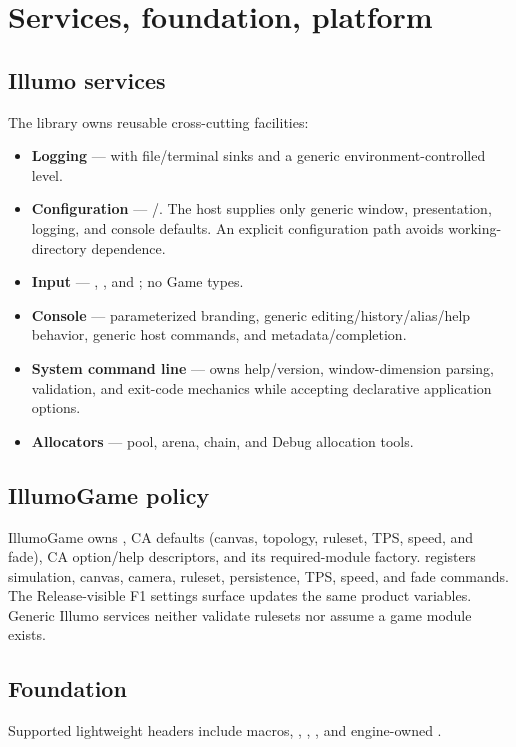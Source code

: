 \section{Services, foundation, platform}
\label{sec:services}

\subsection{Illumo services}
The library owns reusable cross-cutting facilities:
\begin{itemize}
  \item \textbf{Logging} ---  with file/terminal sinks and a
        generic environment-controlled level.
  \item \textbf{Configuration} --- /.
        The host supplies only generic window, presentation, logging, and console
        defaults. An explicit configuration path avoids working-directory
        dependence.
  \item \textbf{Input} --- , ,
        and ; no Game types.
  \item \textbf{Console} --- parameterized  branding,
        generic editing/history/alias/help behavior, generic host commands, and
         metadata/completion.
  \item \textbf{System command line} ---  owns
        help/version, window-dimension parsing, validation, and exit-code
        mechanics while accepting declarative application options.
  \item \textbf{Allocators} --- pool, arena, chain, and Debug allocation tools.
\end{itemize}

\subsection{IllumoGame policy}
IllumoGame owns , CA defaults (canvas,
topology, ruleset, TPS, speed, and fade), CA option/help descriptors, and its
required-module factory.  registers simulation,
canvas, camera, ruleset, persistence, TPS, speed, and fade commands. The
Release-visible F1 settings surface updates the same product variables. Generic
Illumo services neither validate rulesets nor assume a game module exists.

\subsection{Foundation}
Supported lightweight headers include macros, ,
, , and engine-owned
.

